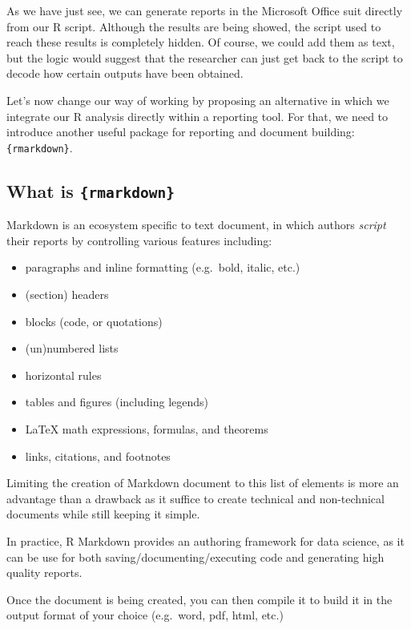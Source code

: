 \documentclass[
]{book}
\providecommand{\tightlist}{%
  \setlength{\itemsep}{0pt}\setlength{\parskip}{0pt}}
\begin{document}
As we have just see, we can generate reports in the Microsoft Office suit directly from our R script. Although the results are being showed, the script used to reach these results is completely hidden. Of course, we could add them as text, but the logic would suggest that the researcher can just get back to the script to decode how certain outputs have been obtained.

Let's now change our way of working by proposing an alternative in which we integrate our R analysis directly within a reporting tool. For that, we need to introduce another useful package for reporting and document building: \texttt{\{rmarkdown\}}.

\hypertarget{what-is-rmarkdown}{%
\subsection{\texorpdfstring{What is \texttt{\{rmarkdown\}}}{What is \{rmarkdown\}}}\label{what-is-rmarkdown}}

Markdown is an ecosystem specific to text document, in which authors \emph{script} their reports by controlling various features including:

\begin{itemize}
\tightlist
\item
  paragraphs and inline formatting (e.g.~bold, italic, etc.)
\item
  (section) headers
\item
  blocks (code, or quotations)
\item
  (un)numbered lists
\item
  horizontal rules
\item
  tables and figures (including legends)
\item
  LaTeX math expressions, formulas, and theorems
\item
  links, citations, and footnotes
\end{itemize}

Limiting the creation of Markdown document to this list of elements is more an advantage than a drawback as it suffice to create technical and non-technical documents while still keeping it simple.

In practice, R Markdown provides an authoring framework for data science, as it can be use for both saving/documenting/executing code and generating high quality reports.

Once the document is being created, you can then compile it to build it in the output format of your choice (e.g.~word, pdf, html, etc.)
\end{document}
